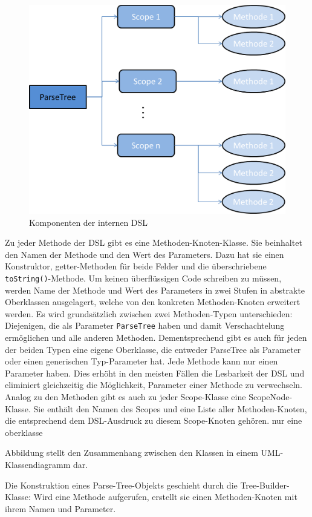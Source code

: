 \begin{figure}[H]
\centering\includegraphics[width=.8\textwidth]{images/kapitel4/parseTree.png}
\caption{Komponenten der internen DSL}
\label{fig:parse-tree}
\end{figure}

Zu jeder Methode der DSL gibt es eine Methoden-Knoten-Klasse. Sie beinhaltet den Namen der Methode und den Wert des Parameters. Dazu hat sie einen Konstruktor, getter-Methoden für beide Felder und die überschriebene \texttt{toString()}-Methode. Um keinen überflüssigen Code schreiben zu müssen, werden Name der Methode und Wert des Parameters in zwei Stufen in abstrakte Oberklassen ausgelagert, welche von den konkreten Methoden-Knoten erweitert werden. Es wird grundsätzlich zwischen zwei Methoden-Typen unterschieden: Diejenigen, die als Parameter \texttt{ParseTree} haben und damit Verschachtelung ermöglichen und alle anderen Methoden. Dementsprechend gibt es auch für jeden der beiden Typen eine eigene Oberklasse, die entweder ParseTree als Parameter oder einen generischen Typ-Parameter hat. Jede Methode kann nur einen Parameter haben. Dies erhöht in den meisten Fällen die Lesbarkeit der DSL und eliminiert gleichzeitig die Möglichkeit, Parameter einer Methode zu verwechseln. \\
Analog zu den Methoden gibt es auch zu jeder Scope-Klasse eine ScopeNode-Klasse. Sie enthält den Namen des Scopes und eine Liste aller Methoden-Knoten, die entsprechend dem DSL-Ausdruck zu diesem Scope-Knoten gehören. nur eine oberklasse

Abbildung stellt den Zusammenhang zwischen den Klassen in einem UML-Klassendiagramm dar.


Die Konstruktion eines Parse-Tree-Objekts geschieht durch die Tree-Builder-Klasse: Wird eine Methode aufgerufen, erstellt sie einen Methoden-Knoten mit ihrem Namen und Parameter.

